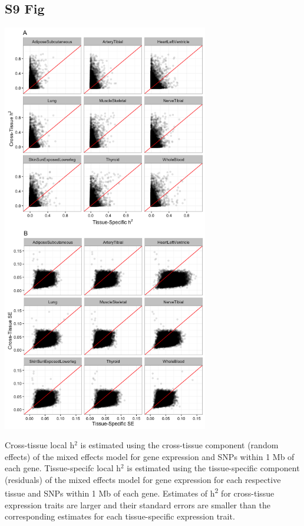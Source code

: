 \documentclass[10pt,letterpaper]{article}
\begin{document}
\begin{singlespace}
\subsection*{S9 Fig}
\includegraphics[width=9cm]{Figures/GenArch_Supp/S6Fig.png}
\label{S9_Fig}

 Cross-tissue local h$^2$ is estimated using the cross-tissue component (random effects) of the mixed effects model for gene expression and SNPs within 1 Mb of each gene. Tissue-specifc local h$^2$ is estimated using the tissue-specific component (residuals) of the mixed effects model for gene expression for each respective tissue and SNPs within 1 Mb of each gene. Estimates of h\textsuperscript{2} for cross-tissue expression traits are larger and their standard errors are smaller than the corresponding estimates for each tissue-specific expression trait.


\end{singlespace}
\end{document}
